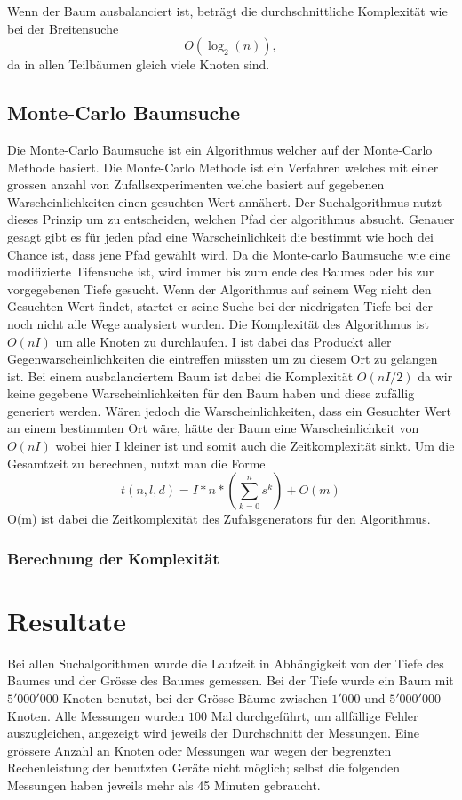 \documentclass[a4paper,11pt]{article}
\begin{document}
Wenn der Baum ausbalanciert ist, beträgt die durchschnittliche Komplexität wie bei der Breitensuche $$O(\log_2(n)),$$ da in allen Teilbäumen gleich viele Knoten sind.

\subsection{Monte-Carlo Baumsuche}

Die Monte-Carlo Baumsuche ist ein Algorithmus welcher auf der Monte-Carlo Methode basiert. Die Monte-Carlo Methode ist ein Verfahren welches mit einer grossen anzahl von Zufallsexperimenten welche basiert auf gegebenen Warscheinlichkeiten einen gesuchten Wert annähert.
Der Suchalgorithmus nutzt dieses Prinzip um zu entscheiden, welchen Pfad der algorithmus absucht. Genauer gesagt gibt es für jeden pfad eine Warscheinlichkeit die bestimmt wie hoch dei Chance ist, dass jene Pfad gewählt wird. Da die Monte-carlo Baumsuche wie eine modifizierte Tifensuche ist, wird immer bis zum ende des Baumes oder bis zur vorgegebenen Tiefe gesucht. Wenn der Algorithmus auf seinem Weg nicht den Gesuchten Wert findet, startet er seine Suche bei der niedrigsten Tiefe bei der noch nicht alle Wege analysiert wurden. 
Die Komplexität des Algorithmus ist $O(nI)$ um alle Knoten zu durchlaufen. I ist dabei das Produckt aller Gegenwarscheinlichkeiten die eintreffen müssten um zu diesem Ort zu gelangen ist. Bei einem ausbalanciertem Baum ist dabei die Komplexität $O(nI/2)$ da wir keine gegebene Warscheinlichkeiten für den Baum haben und diese zufällig generiert werden. Wären jedoch die Warscheinlichkeiten, dass ein Gesuchter Wert an einem bestimmten Ort wäre, hätte der Baum eine Warscheinlichkeit von $O(nI)$ wobei hier I kleiner ist und somit auch die Zeitkomplexität sinkt. 
Um die Gesamtzeit zu berechnen, nutzt man die Formel $$ t(n,l,d) = I*n*(\sum_{k=0}^{n} s^k) + O(m)$$ O(m) ist dabei die Zeitkomplexität des Zufalsgenerators für den Algorithmus.
\subsubsection{Berechnung der Komplexität}

\section{Resultate}
Bei allen Suchalgorithmen wurde die Laufzeit in Abhängigkeit von der Tiefe des Baumes und der Grösse des Baumes gemessen. Bei der Tiefe wurde ein Baum mit $5'000'000$ Knoten benutzt, bei der Grösse Bäume zwischen $1'000$ und $5'000'000$ Knoten. Alle Messungen wurden $100$ Mal durchgeführt, um allfällige Fehler auszugleichen, angezeigt wird jeweils der Durchschnitt der Messungen. Eine grössere Anzahl an Knoten oder Messungen war wegen der begrenzten Rechenleistung der benutzten Geräte nicht möglich; selbst die folgenden Messungen haben jeweils mehr als 45 Minuten gebraucht.
\end{document}
